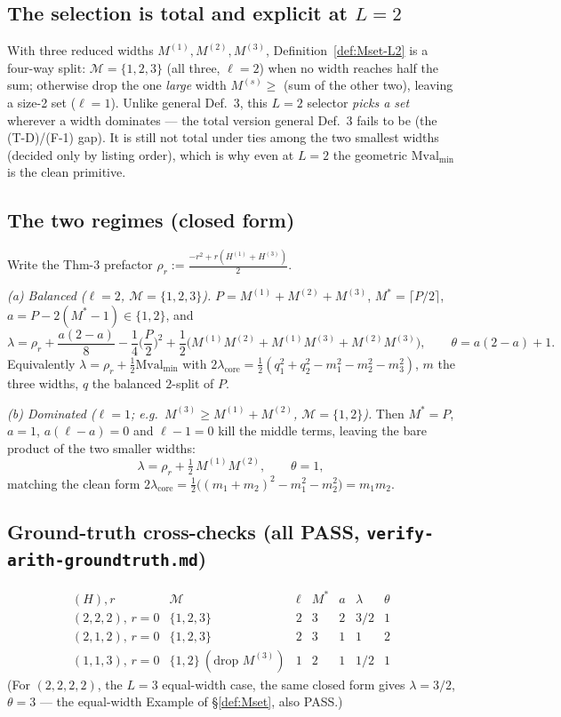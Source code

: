 \documentclass[11pt]{article}
\theoremstyle{plain}
\theoremstyle{definition}
\theoremstyle{remark}
\newcommand{\rlct}{\lambda}          %
\newcommand{\rorder}{\theta}         %
\newcommand{\Mval}{\mathrm{Mval}}
\newcommand{\Ms}{M^{\ast}}           %
\begin{document}
\subsection{The selection is total and explicit at $L=2$}

With three reduced widths $M^{(1)},M^{(2)},M^{(3)}$, Definition~\ref{def:Mset-L2} is a four-way split:
$\mathcal M=\{1,2,3\}$ (all three, $\ell=2$) when no width reaches half the sum; otherwise drop the one
\emph{large} width $M^{(s)}\ge$ (sum of the other two), leaving a size-2 set ($\ell=1$). Unlike general
Def.~3, this $L=2$ selector \emph{picks a set} wherever a width dominates --- the total version general
Def.~3 fails to be (the (T-D)/(F-1) gap). It is still not total under ties among the two smallest widths
(decided only by listing order), which is why even at $L=2$ the geometric $\Mval_{\min}$ is the clean
primitive.

\subsection{The two regimes (closed form)}

Write the Thm-3 prefactor $\rho_r:=\tfrac{-r^2+r(H^{(1)}+H^{(3)})}{2}$.

\emph{(a) Balanced ($\ell=2$, $\mathcal M=\{1,2,3\}$).} $P=M^{(1)}+M^{(2)}+M^{(3)}$, $\Ms=\lceil P/2\rceil$,
$a=P-2(\Ms-1)\in\{1,2\}$, and
\[
 \rlct=\rho_r+\frac{a(2-a)}{8}-\frac14\Big(\frac P2\Big)^2
       +\frac12\big(M^{(1)}M^{(2)}+M^{(1)}M^{(3)}+M^{(2)}M^{(3)}\big),\qquad \rorder=a(2-a)+1.
\]
Equivalently $\rlct=\rho_r+\tfrac12\Mval_{\min}$ with
$2\rlct_{\mathrm{core}}=\tfrac12(q_1^2+q_2^2-m_1^2-m_2^2-m_3^2)$, $m$ the three widths, $q$ the balanced
$2$-split of $P$.

\emph{(b) Dominated ($\ell=1$; e.g.\ $M^{(3)}\ge M^{(1)}+M^{(2)}$, $\mathcal M=\{1,2\}$).} Then $\Ms=P$,
$a=1$, $a(\ell-a)=0$ and $\ell-1=0$ kill the middle terms, leaving the bare product of the two smaller
widths:
\[
 \rlct=\rho_r+\tfrac12\,M^{(1)}M^{(2)},\qquad \rorder=1,
\]
matching the clean form $2\rlct_{\mathrm{core}}=\tfrac12\big((m_1+m_2)^2-m_1^2-m_2^2\big)=m_1m_2$.

\subsection{Ground-truth cross-checks (all PASS, \texttt{verify-arith-groundtruth.md})}

\[
\begin{array}{l|c|c|c|c|c|c}
 (H),r & \mathcal M & \ell & \Ms & a & \rlct & \rorder\\\hline
 (2,2,2),\,r{=}0 & \{1,2,3\} & 2 & 3 & 2 & 3/2 & 1\\
 (2,1,2),\,r{=}0 & \{1,2,3\} & 2 & 3 & 1 & 1 & 2\\
 (1,1,3),\,r{=}0 & \{1,2\}\ (\text{drop }M^{(3)}) & 1 & 2 & 1 & 1/2 & 1
\end{array}
\]
(For $(2,2,2,2)$, the $L=3$ equal-width case, the same closed form gives $\rlct=3/2$, $\rorder=3$ --- the
equal-width Example of \S\ref{def:Mset}, also PASS.)
\end{document}
